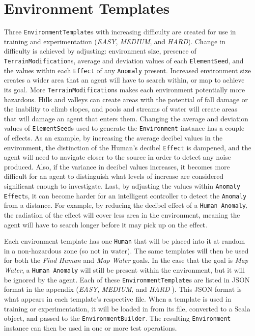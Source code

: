 \section{Environment Templates} \label{sec:test_environment_templates}
Three \texttt{EnvironmentTemplate}s with increasing difficulty are created for use in training and experimentation (\textit{EASY}, \textit{MEDIUM}, and \textit{HARD}).
Change in difficulty is achieved by adjusting: environment size, presence of \texttt{TerrainModification}s, average and deviation values of each \texttt{ElementSeed}, and the values within each \texttt{Effect} of any \texttt{Anomaly} present.
Increased environment size creates a wider area that an agent will have to search within, or map to achieve its goal.
More \texttt{TerrainModification}s makes each environment potentially more hazardous.
Hills and valleys can create areas with the potential of fall damage or the inability to climb slopes, and pools and streams of water will create areas that will damage an agent that enters them.
Changing the average and deviation values of \texttt{ElementSeed}s used to generate the \texttt{Environment} instance has a couple of effects.
As an example, by increasing the average decibel values in the environment, the distinction of the Human's decibel \texttt{Effect} is dampened, and the agent will need to navigate closer to the source in order to detect any noise produced.
Also, if the variance in decibel values increases, it becomes more difficult for an agent to distinguish what levels of increase are considered significant enough to investigate.
Last, by adjusting the values within \texttt{Anomaly} \texttt{Effect}s, it can become harder for an intelligent controller to detect the \texttt{Anomaly} from a distance.
For example, by reducing the decibel effect of a \texttt{Human Anomaly}, the radiation of the effect will cover less area in the environment, meaning the agent will have to search longer before it may pick up on the effect.

Each environment template has one \texttt{Human} that will be placed into it at random in a non-hazardous zone (so not in water).
The same templates will then be used for both the \textit{Find Human} and \textit{Map Water} goals.
In the case that the goal is \textit{Map Water}, a \texttt{Human Anomaly} will still be present within the environment, but it will be ignored by the agent.
Each of these \texttt{EnvironmentTemplate}s are listed in JSON format in the appendix (\textit{EASY}, \textit{MEDIUM}, and \textit{HARD} ).
This JSON format is what appears in each template's respective file.
When a template is used in training or experimentation, it will be loaded in from its file, converted to a Scala object, and passed to the \texttt{EnvironmentBuilder}.
The resulting \texttt{Environment} instance can then be used in one or more test operations.



